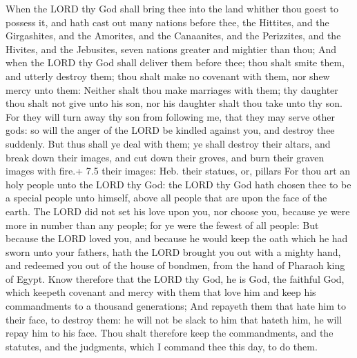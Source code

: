  When the LORD thy God shall bring thee into the land
whither thou goest to possess it, and hath cast out many nations before
thee, the Hittites, and the Girgashites, and the Amorites, and the
Canaanites, and the Perizzites, and the Hivites, and the Jebusites,
seven nations greater and mightier than thou;  And when the
LORD thy God shall deliver them before thee; thou shalt smite them, and
utterly destroy them; thou shalt make no covenant with them, nor shew
mercy unto them:  Neither shalt thou make marriages with
them; thy daughter thou shalt not give unto his son, nor his daughter
shalt thou take unto thy son.  For they will turn away thy
son from following me, that they may serve other gods: so will the anger
of the LORD be kindled against you, and destroy thee suddenly.
 But thus shall ye deal with them; ye shall destroy their
altars, and break down their images, and cut down their groves, and burn
their graven images with fire.+ 7.5 their images: Heb. their statues,
or, pillars  For thou art an holy people unto the LORD thy
God: the LORD thy God hath chosen thee to be a special people unto
himself, above all people that are upon the face of the earth.
 The LORD did not set his love upon you, nor choose you,
because ye were more in number than any people; for ye were the fewest
of all people:  But because the LORD loved you, and because
he would keep the oath which he had sworn unto your fathers, hath the
LORD brought you out with a mighty hand, and redeemed you out of the
house of bondmen, from the hand of Pharaoh king of Egypt. 
Know therefore that the LORD thy God, he is God, the faithful God, which
keepeth covenant and mercy with them that love him and keep his
commandments to a thousand generations;  And repayeth them
that hate him to their face, to destroy them: he will not be slack to
him that hateth him, he will repay him to his face.  Thou
shalt therefore keep the commandments, and the statutes, and the
judgments, which I command thee this day, to do them.

